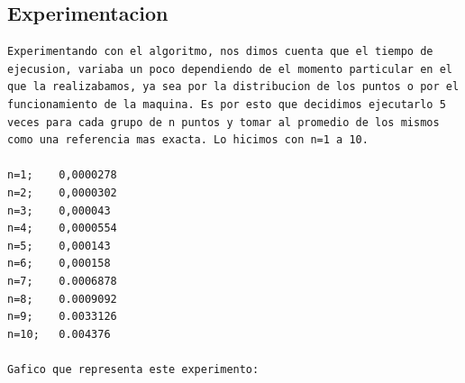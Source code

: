 \documentclass[10pt,a4paper]{article}
\begin{document}
\subsection{Experimentacion}
\begin{verbatim}
Experimentando con el algoritmo, nos dimos cuenta que el tiempo de ejecusion, variaba un poco dependiendo de el momento particular en el que la realizabamos, ya sea por la distribucion de los puntos o por el funcionamiento de la maquina. Es por esto que decidimos ejecutarlo 5 veces para cada grupo de n puntos y tomar al promedio de los mismos como una referencia mas exacta. Lo hicimos con n=1 a 10. 

n=1;	0,0000278
n=2;	0,0000302
n=3;	0,000043
n=4;	0,0000554
n=5;	0,000143
n=6;	0,000158
n=7;	0.0006878
n=8;	0.0009092
n=9;	0.0033126
n=10;	0.004376

Gafico que representa este experimento:

\end{verbatim}
\end{document}
